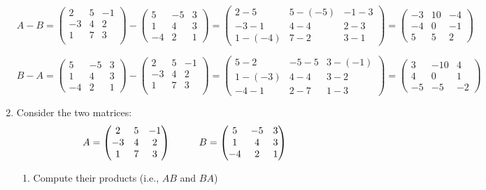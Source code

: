 \documentclass[fleqn]{article}
\begin{document}
\begin{enumerate}
  \noindent
  $A-B=
  \begin{pmatrix}
      2 & 5 & -1 \\
      -3 & 4 & 2 \\ 
      1 & 7 & 3 \\ 
  \end{pmatrix}
  -
  \begin{pmatrix}
    5 & -5 & 3 \\
    1 & 4 & 3 \\
    -4 & 2 & 1
  \end{pmatrix}
  =
  \begin{pmatrix}
    2-5 & 5-(-5) & -1-3 \\
    -3-1 & 4-4 & 2-3 \\
    1-(-4) & 7-2 & 3-1
  \end{pmatrix}
  =
  \begin{pmatrix}
    -3 & 10 & -4 \\
    -4 & 0 & -1 \\
    5 & 5 & 2
  \end{pmatrix}
  $
  
  \noindent
  $B-A=
  \begin{pmatrix}
    5 & -5 & 3 \\
    1 & 4 & 3 \\
    -4 & 2 & 1
  \end{pmatrix}
  -
  \begin{pmatrix}
    2 & 5 & -1 \\
    -3 & 4 & 2 \\ 
    1 & 7 & 3 \\ 
  \end{pmatrix}
  =
  \begin{pmatrix}
    5-2 & -5-5 & 3-(-1) \\
    1-(-3) & 4-4 & 3-2 \\
    -4-1 & 2-7 & 1-3
  \end{pmatrix}
  =
  \begin{pmatrix}
    3 & -10 & 4 \\
    4 & 0 & 1 \\
    -5 & -5 & -2
  \end{pmatrix}
  $
  
  \item  Consider the two matrices:
  $$A=\begin{pmatrix}
  2 & 5 & -1 \\
  -3 & 4 & 2 \\
  1 & 7 & 3
  \end{pmatrix} \hskip 1truecm B=\begin{pmatrix}
  5 & -5 & 3 \\
  1 & 4 & 3 \\
  -4 & 2 & 1
  \end{pmatrix}$$ 
  \begin{enumerate}
  \item Compute their products  (i.e., $AB$ and $BA$)
  

\end{enumerate}
\end{enumerate}
\end{document}
